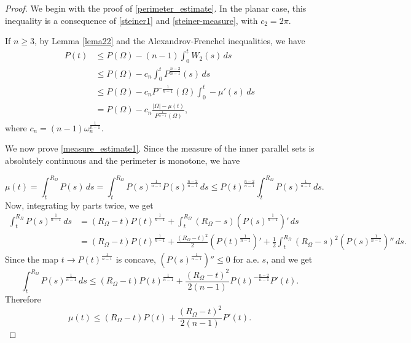 \documentclass[oneside,a4paper,11pt,notitlepage]{article}
\newcommand{\abs}[1]{{\left|#1\right|}}
\theoremstyle{definition}
\theoremstyle{plain}
\theoremstyle{definition}
\begin{document}
\begin{proof}We begin with the proof of \eqref{perimeter_estimate}.  
In the planar case, this inequality is a consequence of \eqref{steiner1} and \eqref{steiner-measure}, with $c_2 = 2\pi$.


If $n\geq 3$, by Lemma \ref{lema22} and the Alexandrov-Frenchel inequalities, we have
\begin{align*}
          P(t) &\le P(\Omega)-(n-1)\int_0^tW_2(s)\,ds\\
         &\leq P(\Omega)- c_n \int_0^t P^{\frac{n-2}{n-1}}(s)\, ds\\
        &\leq P(\Omega)- c_n P^{-\frac{1}{n-1}}(\Omega)\int_0^t -\mu'(s)\, ds\\
         &=P(\Omega) - c_n \frac{\abs{\Omega} - \mu(t)}{P^{\frac{1}{n-1}}(\Omega)},
    \end{align*}
    where $c_n=(n-1)\omega_n^{\frac{1}{n-1}}$.

We now prove \eqref{measure_estimate1}.  
Since the measure of the inner parallel sets is absolutely continuous and the perimeter is monotone, we have

    \begin{equation*}
        \mu(t) = \int_{t}^{R_\Omega}P(s)\,ds = \int_{t}^{R_\Omega}P(s)^{\frac{1}{n-1}}P(s)^{\frac{n-2}{n-1}}\,ds\le P(t)^{\frac{n-2}{n-1}}\int_{t}^{R_\Omega}P(s)^{\frac{1}{n-1}}\,ds.
    \end{equation*}
    Now, integrating by parts twice, we get
    \begin{equation*}
    \begin{split}
    \int_{t}^{R_\Omega}P(s)^{\frac{1}{n-1}}\,ds &= (R_\Omega-t)P(t)^{\frac{1}{n-1}}+\int_t^{R_\Omega}(R_\Omega-s)(P(s)^{\frac{1}{n-1}})'\,ds \\
    &=(R_\Omega-t)P(t)^{\frac{1}{n-1}}+\frac{(R_\Omega-t)^2}{2}(P(t)^{\frac{1}{n-1}})'+\frac{1}{2}\int_t^{R_\Omega}(R_\Omega-s)^2(P(s)^{\frac{1}{n-1}})''\,ds.
    \end{split}
\end{equation*}
Since the map $t\to P(t)^{\frac{1}{n-1}}$ is concave, $(P(s)^{\frac{1}{n-1}})''\le 0$ for a.e. $s$, and we get
\begin{equation*}
  \int_{t}^{R_\Omega}P(s)^{\frac{1}{n-1}}\,ds\le (R_\Omega-t)P(t)^{\frac{1}{n-1}}+\frac{(R_\Omega-t)^2}{2(n-1)}P(t)^{-\frac{n-2}{n-1}}P'(t)  . 
\end{equation*}
    Therefore
    \begin{equation*}
     \mu(t)\leq (R_\Omega-t)P(t)+ \frac{(R_\Omega-t)^2}{2(n-1)}P'(t).   
    \end{equation*}
\end{proof}
\end{document}
